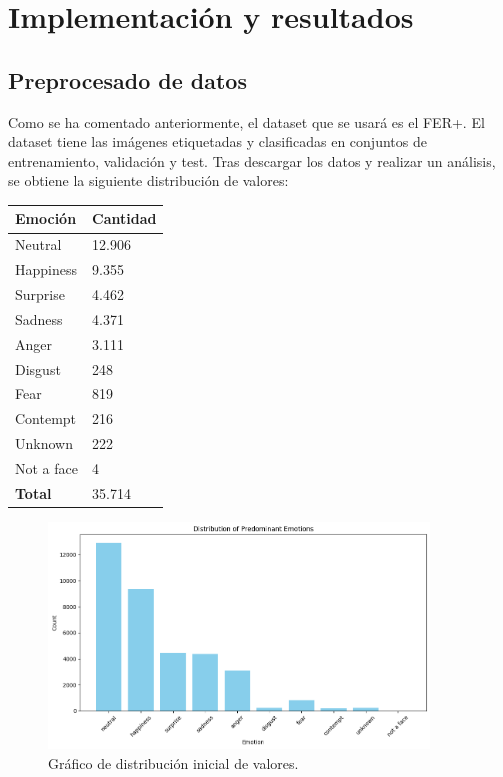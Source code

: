 \documentclass[12pt]{report} %
\begin{document}
\chapter{Implementación y resultados}

\section{Preprocesado de datos}

Como se ha comentado anteriormente, el dataset que se usará es el FER+. El dataset tiene las imágenes etiquetadas y clasificadas en conjuntos de entrenamiento, validación y test. Tras descargar los datos y realizar un análisis, se obtiene la siguiente distribución de valores:

\begin{table}[H]
	{
	  \begin{tabular}{|P{9cm}|P{4cm}|}
		\hline
		{\textbf{Emoción}} & {\textbf{Cantidad}} \\
		\hline
		Neutral & 12.906 \\
		\hline
		Happiness & 9.355 \\
		\hline
		Surprise & 4.462 \\
		\hline
		Sadness & 4.371 \\
		\hline
		Anger & 3.111 \\
		\hline
		Disgust & 248 \\
		\hline
		Fear & 819 \\
		\hline
		Contempt & 216 \\
		\hline
		Unknown & 222 \\
		\hline
		Not a face & 4 \\
		\hline
		{\textbf{Total}} & 35.714 \\
		\hline
	  \end{tabular}
	}
\end{table}

\begin{figure}[H]
	\centering
	\includegraphics[width=0.9\textwidth]{distribucionInicial.png}
	\caption{Gráfico de distribución inicial de valores.}
	\label{fig:imagen30}
\end{figure}
\end{document}
